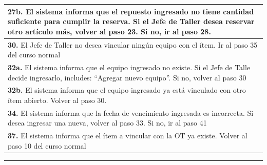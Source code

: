 \documentclass[12pt]{extarticle}
\begin{document}
\begin{spacing}{1.2}
\begin{longtable}{ |p{8cm}|p{8cm}| }
            \hline
            \multicolumn{2}{|p{16cm}|}{\textbf{27b. }El sistema informa que el repuesto ingresado no tiene cantidad suficiente para cumplir la reserva. Si el Jefe de Taller desea reservar otro artículo más, volver al paso 23. Si no, ir al paso 28.}\\
            \hline
            \multicolumn{2}{|p{16cm}|}{\textbf{30. }El Jefe de Taller no desea vincular ningún equipo con el ítem. Ir al paso 35 del curso normal}\\
            \hline
            \multicolumn{2}{|p{16cm}|}{\textbf{32a. }El sistema informa que el equipo ingresado no existe. Si el Jefe de Talle decide ingresarlo, includes: ``Agregar nuevo equipo''. Si no, volver al paso 30}\\
            \hline
            \multicolumn{2}{|p{16cm}|}{\textbf{32b. }El sistema informa que el equipo ingresado ya está vinculado con otro ítem abierto. Volver al paso 30.}\\
            \hline
            \multicolumn{2}{|p{16cm}|}{\textbf{34. }El sistema informa que la fecha de vencimiento ingresada es incorrecta. Si desea ingresar una nueva, volver al paso 33. Si no, ir al paso 41}\\
            \hline  
            \multicolumn{2}{|p{16cm}|}{\textbf{37. }El sistema informa que el ítem a vincular con la OT ya existe. Volver al paso 10 del curso normal}\\
        \hline  
    \end{longtable}


    \noindent\rule{169mm}{0.8mm}\\

    \setcounter{step}{0}



\end{spacing}
\end{document}
